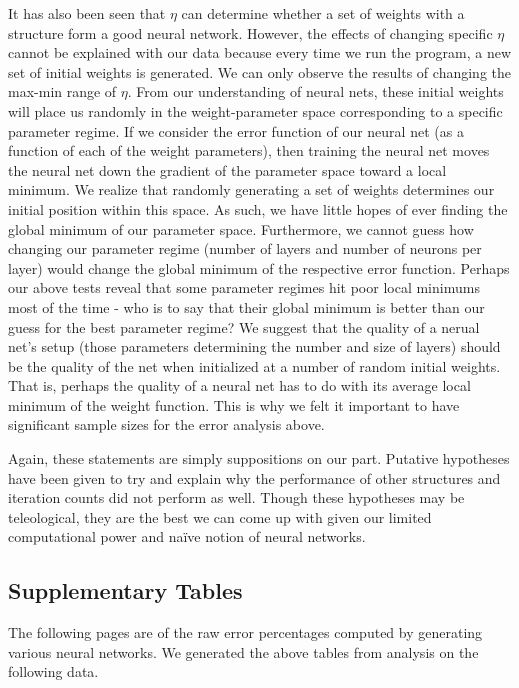 \documentclass[12pt]{article}
\begin{document}
It has also been seen that $\eta$ can determine whether a set of weights with a structure form a good neural network.
However, the effects of changing specific $\eta$ cannot be explained with our data because every time we run the program, a new set of initial weights is generated. We can only observe the results of changing the max-min range of $\eta$. From our understanding of neural nets, these initial weights will place us randomly in the weight-parameter space corresponding to a specific parameter regime. If we consider the error function of our neural net (as a function of each of the weight parameters), then training the neural net moves the neural net down the gradient of the parameter space toward a local minimum. We realize that randomly generating a set of weights determines our initial position within this space. As such, we have little hopes of ever finding the global minimum of our parameter space. Furthermore, we cannot guess how changing our parameter regime (number of layers and number of neurons per layer) would change the global minimum of the respective error function. Perhaps our above tests reveal that some parameter regimes hit poor local minimums most of the time - who is to say that their global minimum is better than our guess for the best parameter regime? We suggest that the quality of a nerual net's setup (those parameters determining the number and size of layers) should be the quality of the net when initialized at a number of random initial weights. That is, perhaps the quality of a neural net has to do with its average local minimum of the weight function. This is why we felt it important to have significant sample sizes for the error analysis above.


Again, these statements are simply suppositions on our part. Putative hypotheses have been given to try and explain why the performance of other structures and iteration counts did not perform as well.
Though these hypotheses may be teleological, they are the best we can come up with given our limited computational power and na\"ive notion of neural networks.

\subsection*{Supplementary Tables}
The following pages are of the raw error percentages computed by generating various neural networks.
We generated the above tables from analysis on the following data.
\end{document}
